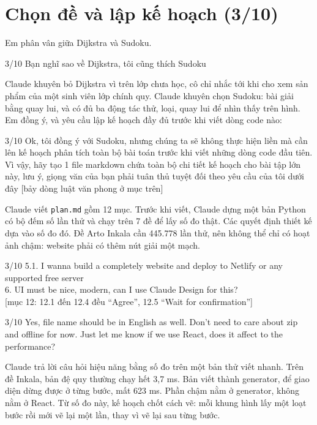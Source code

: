 \section{Chọn đề và lập kế hoạch (3/10)}

Em phân vân giữa Dijkstra và Sudoku.

\begin{promptbox}{3/10}
Bạn nghĩ sao về Dijkstra, tôi cũng thích Sudoku
\end{promptbox}

Claude khuyên bỏ Dijkstra vì trên lớp chưa học, cô chỉ nhắc tới khi cho xem sản phẩm của một sinh viên lớp chính quy. Claude khuyên chọn Sudoku: bài giải bằng quay lui, và có đủ ba động tác thử, loại, quay lui để nhìn thấy trên hình. Em đồng ý, và yêu cầu lập kế hoạch đầy đủ trước khi viết dòng code nào:

\begin{promptbox}{3/10}
Ok, tôi đồng ý với Sudoku, nhưng chúng ta sẽ không thực hiện liền mà cần lên kế hoạch phân tích toàn bộ bài toán trước khi viết những dòng code đầu tiên. Vì vậy, hãy tạo 1 file markdown chứa toàn bộ chi tiết kế hoạch cho bài tập lớn này, lưu ý, giọng văn của bạn phải tuân thủ tuyệt đối theo yêu cầu của tôi dưới đây [bảy dòng luật văn phong ở mục trên]
\end{promptbox}

Claude viết \texttt{plan.md} gồm 12 mục. Trước khi viết, Claude dựng một bản Python có bộ đếm số lần thử và chạy trên 7 đề để lấy số đo thật. Các quyết định thiết kế dựa vào số đo đó. Đề Arto Inkala cần 445.778 lần thử, nên không thể chỉ có hoạt ảnh chậm: website phải có thêm nút giải một mạch.

\begin{promptbox}{3/10}
5.1. I wanna build a completely website and deploy to Netlify or any supported free server\\
6. UI must be nice, modern, can I use Claude Design for this?\\[0pt]
[mục 12: 12.1 đến 12.4 đều ``Agree'', 12.5 ``Wait for confirmation'']
\end{promptbox}

\begin{promptbox}{3/10}
Yes, file name should be in English as well. Don't need to care about zip and offline for now. Just let me know if we use React, does it affect to the performance?
\end{promptbox}

Claude trả lời câu hỏi hiệu năng bằng số đo trên một bản thử viết nhanh. Trên đề Inkala, bản đệ quy thường chạy hết 3,7 ms. Bản viết thành generator, để giao diện dừng được ở từng bước, mất 623 ms. Phần chậm nằm ở generator, không nằm ở React. Từ số đo này, kế hoạch chốt cách vẽ: mỗi khung hình lấy một loạt bước rồi mới vẽ lại một lần, thay vì vẽ lại sau từng bước.

